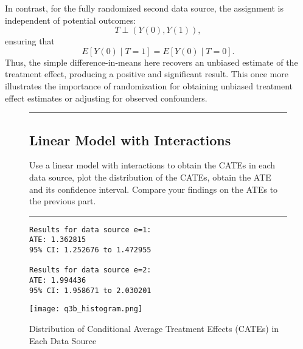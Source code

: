 \documentclass{article}
\newenvironment{colorparagraph}[1]{\par\color{#1}}{\par}
\begin{document}
In contrast, for the fully randomized second data source, the assignment is independent of potential outcomes:
\[
T \perp (Y(0), Y(1)),
\]
ensuring that
\[
E[Y(0)\mid T=1] = E[Y(0)\mid T=0].
\]
Thus, the simple difference-in-means here recovers an unbiased estimate of the treatment effect, producing a positive and significant result. This once more illustrates the importance of randomization for obtaining unbiased treatment effect estimates or adjusting for observed confounders.

\begin{figure}[H]
  \begin{colorparagraph}{questioncolor}
  \rule{\textwidth}{0.5pt}
  \label{q3b}
  \subsection{Linear Model with Interactions}

  Use a linear model with interactions to obtain the CATEs in each data source, plot the distribution of the CATEs, obtain the ATE and its confidence interval. Compare your findings on the ATEs to the previous part.

  \rule{\textwidth}{0.5pt}
  \end{colorparagraph}
\end{figure}

\begin{figure}[H]
  \begin{lstlisting}[style=RstyleComment, caption=ATE and Confidence Interval Estimates Ignoring Covariates]
Results for data source e=1:
ATE: 1.362815 
95% CI: 1.252676 to 1.472955 

Results for data source e=2:
ATE: 1.994436 
95% CI: 1.958671 to 2.030201
  \end{lstlisting}
\end{figure}


\begin{figure}[H]
  \centering
  \texttt{[image: q3b\_histogram.png]}
  \caption{Distribution of Conditional Average Treatment Effects (CATEs) in Each Data Source}
\end{figure}
\end{document}
